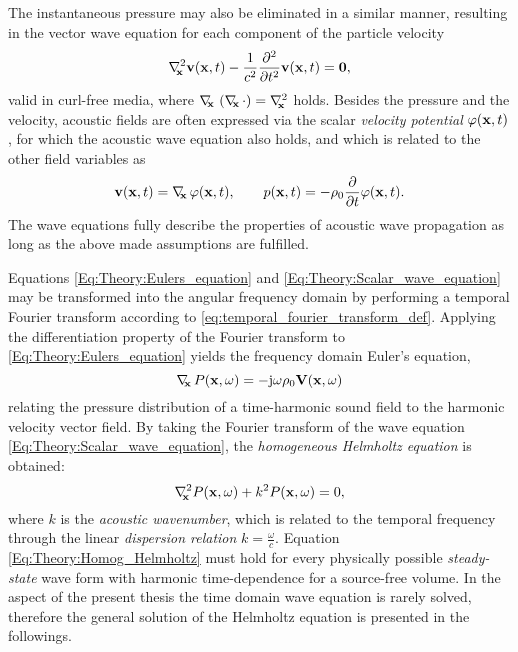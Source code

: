 The instantaneous pressure may also be eliminated in a similar manner, resulting in the vector wave equation for each component of the particle velocity
\begin{equation}
\nabla^2_{\!\!\mathbf{x}} \mathbf{v}(\mathbf{x},t) - \frac{1}{c^2} \frac{\partial^2}{\partial t^2} \mathbf{v}(\mathbf{x},t) = \mathbf{0},
\label{Eq:Theory:Vector_wave_equation}
\end{equation}
valid in curl-free media, where $\nabla_{\!\!\mathbf{x}}\, \left( \nabla_{\!\!\mathbf{x}}\, \cdot \right) = \nabla^2_{\!\!\mathbf{x}}$ holds.
%
Besides the pressure and the velocity, acoustic fields are often expressed via the scalar \emph{velocity potential} $\varphi(\mathbf{x},t)$, for which the acoustic wave equation also holds, and which is related to the other field variables as 
\begin{equation}
\mathbf{v}(\mathbf{x},t) = \nabla_{\!\!\mathbf{x}}\, \varphi(\mathbf{x},t), \hspace{7mm} p(\mathbf{x},t) = -\rho_0 \frac{\partial}{\partial t} \varphi(\mathbf{x},t).
\label{eq:theory:velocity_potential_definition}
\end{equation}
%
The wave equations fully describe the properties of acoustic wave propagation as long as the above made assumptions are fulfilled.

\vspace{3mm}
%
Equations \eqref{Eq:Theory:Eulers_equation} and \eqref{Eq:Theory:Scalar_wave_equation} may be transformed into the angular frequency domain by performing a temporal Fourier transform according to \eqref{eq:temporal_fourier_transform_def}.
Applying the differentiation property of the Fourier transform to \eqref{Eq:Theory:Eulers_equation} yields the frequency domain Euler's equation,
\begin{equation}
\nabla_{\!\!\mathbf{x}}\, P(\mathbf{x},\omega) = -\mathrm{j} \omega \rho_0 \mathbf{V}(\mathbf{x},\omega)
\label{Eq:Theory:Freq_Eulers_equation}
\end{equation}
relating the pressure distribution of a time-harmonic sound field to the harmonic velocity vector field.
By taking the Fourier transform of the wave equation \eqref{Eq:Theory:Scalar_wave_equation}, the \emph{homogeneous Helmholtz equation} is obtained:
\begin{equation}
\nabla^2_{\!\!\mathbf{x}} P(\mathbf{x},\omega) + k^2 P(\mathbf{x},\omega) = 0,
\label{Eq:Theory:Homog_Helmholtz}
\end{equation}
where $k$ is the \emph{acoustic wavenumber}, which is related to the temporal frequency through the linear \emph{dispersion relation} $k = \frac{\omega}{c}$.
%
Equation \eqref{Eq:Theory:Homog_Helmholtz} must hold for every physically possible \emph{steady-state} wave form with harmonic time-dependence for a source-free volume. 
In the aspect of the present thesis the time domain wave equation is rarely solved, therefore the general solution of the Helmholtz equation is presented in the followings.

